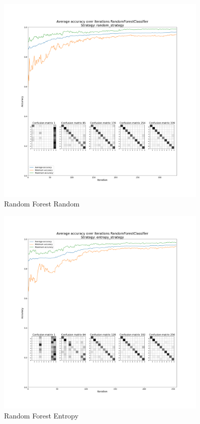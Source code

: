 \begin{figure}[htbp]
\centering
\includegraphics[width=0.9\textwidth]{resources/images/active_learning_RandomForestClassifier_random_strategy_average.png}
\caption{Random Forest Random}
\end{figure}

\begin{figure}[htbp]
\centering
\includegraphics[width=0.9\textwidth]{resources/images/active_learning_RandomForestClassifier_entropy_strategy_average.png}
\caption{Random Forest Entropy}
\end{figure}


